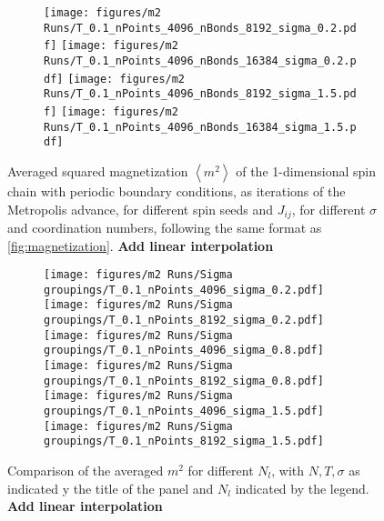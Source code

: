 \begin{figure}[p]
	\hspace{-2cm}
	\begin{subfigure}{1.3\textwidth}
	\texttt{[image: figures/m2 Runs/T\_0.1\_nPoints\_4096\_nBonds\_8192\_sigma\_0.2.pdf]}
	\texttt{[image: figures/m2 Runs/T\_0.1\_nPoints\_4096\_nBonds\_16384\_sigma\_0.2.pdf]}
	\texttt{[image: figures/m2 Runs/T\_0.1\_nPoints\_4096\_nBonds\_8192\_sigma\_1.5.pdf]}
	\texttt{[image: figures/m2 Runs/T\_0.1\_nPoints\_4096\_nBonds\_16384\_sigma\_1.5.pdf]}
	\end{subfigure}
	\caption{ Averaged squared magnetization $\left<m^2 \right>$ of the 1-dimensional spin chain with periodic boundary conditions, as iterations of the Metropolis advance, for different spin seeds and $J_{ij}$, for different $\sigma$ and coordination numbers, following the same format as \ref{fig:magnetization}. \textbf{Add linear interpolation}}
	\label{fig:m2}
\end{figure}

\begin{figure}[p]
	\hspace{-2cm}
	\begin{subfigure}{1.3\textwidth}
	\texttt{[image: figures/m2 Runs/Sigma groupings/T\_0.1\_nPoints\_4096\_sigma\_0.2.pdf]}
	\texttt{[image: figures/m2 Runs/Sigma groupings/T\_0.1\_nPoints\_8192\_sigma\_0.2.pdf]}
	\texttt{[image: figures/m2 Runs/Sigma groupings/T\_0.1\_nPoints\_4096\_sigma\_0.8.pdf]}
	\texttt{[image: figures/m2 Runs/Sigma groupings/T\_0.1\_nPoints\_8192\_sigma\_0.8.pdf]}
	\texttt{[image: figures/m2 Runs/Sigma groupings/T\_0.1\_nPoints\_4096\_sigma\_1.5.pdf]}
	\texttt{[image: figures/m2 Runs/Sigma groupings/T\_0.1\_nPoints\_8192\_sigma\_1.5.pdf]}
	\end{subfigure}
	\caption{Comparison of the averaged $m^2$ for different $N_l$, with $N, T, \sigma$ as indicated y the title of the panel and $N_l$ indicated by the legend. \textbf{Add linear interpolation}}
	\label{fig:m2-comparison}
\end{figure}
